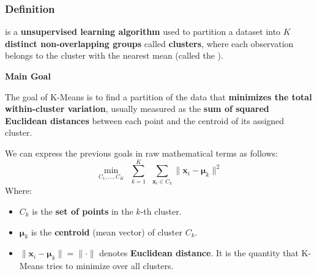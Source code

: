 \subsubsection{Definition}

 is a \textbf{unsupervised learning algorithm} used to partition a dataset into $K$ \textbf{distinct non-overlapping groups} called \textbf{clusters}, where each observation belongs to the cluster with the nearest mean (called the ).

\highspace
\begin{flushleft}
    \textcolor{Green3}{ \textbf{Main Goal}}
\end{flushleft}
The goal of K-Means is to find a partition of the data that \textbf{minimizes the total within-cluster variation}, usually measured as the \textbf{sum of squared Euclidean distances} between each point and the centroid of its assigned cluster.

\highspace
We can express the previous goals in raw mathematical terms as follows:
\begin{equation}
    \min_{C_{1}, ..., C_{K}} \:\: \displaystyle\sum_{k=1}^{K} \:\: \sum_{\mathbf{x}_i \in C_k} \|\mathbf{x}_i - \boldsymbol{\mu}_k\|^{2}
\end{equation}
Where:
\begin{itemize}
    \item $C_{k}$ is the \textbf{set of points} in the $k$-th cluster.
    \item $\boldsymbol{\mu}_{k}$ is the \textbf{centroid} (mean vector) of cluster $C_{k}$.
    \item $\|\mathbf{x}_i - \boldsymbol{\mu}_k\| = \| \cdot \|$ denotes \textbf{Euclidean distance}. It is the quantity that K-Means tries to minimize over all clusters.
\end{itemize}

